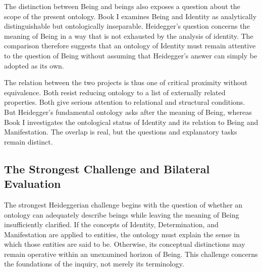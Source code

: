 The distinction between Being and beings
also exposes a question about the scope of
the present ontology. Book I examines Being
and Identity as analytically distinguishable
but ontologically inseparable. Heidegger's
question concerns the meaning of Being in
a way that is not exhausted by the analysis
of identity. The comparison therefore suggests
that an ontology of Identity must remain
attentive to the question of Being without
assuming that Heidegger's answer can simply
be adopted as its own.

\label{para:VS.B01.P01.C08.S11.SS13.P005}

The relation between the two projects is
thus one of critical proximity without
equivalence. Both resist reducing ontology
to a list of externally related properties.
Both give serious attention to relational
and structural conditions. But Heidegger's
fundamental ontology asks after the meaning
of Being, whereas Book I investigates the
ontological status of Identity and its
relation to Being and Manifestation. The
overlap is real, but the questions and
explanatory tasks remain distinct.



\subsection{The Strongest Challenge and Bilateral Evaluation}
\label{subsec:ch08-heidegger-evaluation}

\label{para:VS.B01.P01.C08.S11.SS14.P001}

The strongest Heideggerian challenge begins
with the question of whether an ontology
can adequately describe beings while leaving
the meaning of Being insufficiently clarified.
If the concepts of Identity, Determination,
and Manifestation are applied to entities,
the ontology must explain the sense in which
those entities are said to be. Otherwise,
its conceptual distinctions may remain
operative within an unexamined horizon
of Being. This challenge concerns the
foundations of the inquiry, not merely
its terminology.
\cite{HeideggerBeingTime}

\label{para:VS.B01.P01.C08.S11.SS14.P002}

